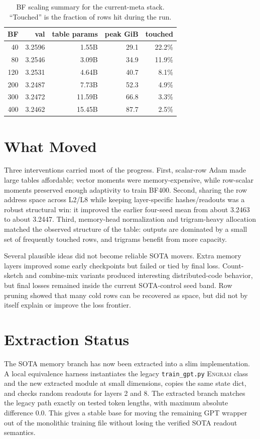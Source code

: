 \documentclass[10pt,twocolumn]{article}
\newcommand{\engram}{\textsc{Engram}}
\begin{document}
\begin{table}[t]
\centering
\small
\begin{tabular}{rrrrr}
\toprule
BF & val & table params & peak GiB & touched \\
\midrule
40  & 3.2596 & 1.55B  & 29.1 & 22.2\% \\
80  & 3.2546 & 3.09B  & 34.9 & 11.9\% \\
120 & 3.2531 & 4.64B  & 40.7 & 8.1\% \\
200 & 3.2487 & 7.73B  & 52.3 & 4.9\% \\
300 & 3.2472 & 11.59B & 66.8 & 3.3\% \\
400 & 3.2462 & 15.45B & 87.7 & 2.5\% \\
\bottomrule
\end{tabular}
\caption{BF scaling summary for the current-meta stack.  ``Touched'' is the
fraction of rows hit during the run.}
\end{table}

\section{What Moved}
Three interventions carried most of the progress.  First, scalar-row Adam made
large tables affordable; vector moments were memory-expensive, while row-scalar
moments preserved enough adaptivity to train BF400.  Second, sharing the row
address space across L2/L8 while keeping layer-specific hashes/readouts was a
robust structural win: it improved the earlier four-seed mean from about 3.2463
to about 3.2447.  Third, memory-head normalization and trigram-heavy allocation
matched the observed structure of the table: outputs are dominated by a small
set of frequently touched rows, and trigrams benefit from more capacity.

Several plausible ideas did not become reliable SOTA movers.  Extra memory
layers improved some early checkpoints but failed or tied by final loss.
Count-sketch and combine-mix variants produced interesting distributed-code
behavior, but final losses remained inside the current SOTA-control seed band.
Row pruning showed that many cold rows can be recovered as space, but did not by
itself explain or improve the loss frontier.

\section{Extraction Status}
The SOTA memory branch has now been extracted into a slim implementation.  A
local equivalence harness instantiates the legacy \texttt{train\_gpt.py}
\engram{} class and the new extracted module at small dimensions, copies the
same state dict, and checks random readouts for layers 2 and 8.  The extracted
branch matches the legacy path exactly on tested token lengths, with maximum
absolute difference 0.0.  This gives a stable base for moving the remaining GPT
wrapper out of the monolithic training file without losing the verified SOTA
readout semantics.
\end{document}
